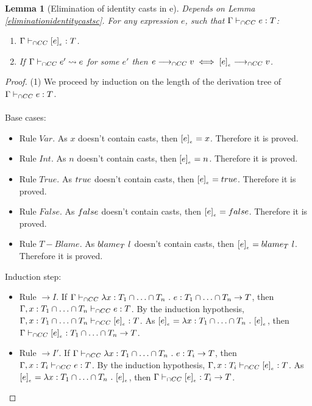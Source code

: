 \documentclass[a4paper]{article}
\newtheorem{lemma}{Lemma}
\begin{document}
\begin{lemma}[Elimination of identity casts in e]
\label{eliminationidentitycastse}
Depends on Lemma \ref{eliminationidentitycastsc}.
For any expression $e$, such that $\Gamma \vdash_{\cap CC} e : T$:
\begin{enumerate}
    \item $\Gamma \vdash_{\cap CC} [e]_{_e} : T$.
    \item If $\Gamma \vdash_{\cap CC} e' \leadsto e$ for some $e'$ then $e \longrightarrow_{\cap CC} v \iff [e]_{_e} \longrightarrow_{\cap CC} v$.
\end{enumerate}
\end{lemma}
\begin{proof}
(1) We proceed by induction on the length of the derivation tree of $\Gamma \vdash_{\cap CC} e : T$.\\\\
Base cases:
\begin{itemize}
    \item Rule $Var$.
    As $x$ doesn't contain casts, then $[e]_{_e} = x$.
    Therefore it is proved.
    \item Rule $Int$.
    As $n$ doesn't contain casts, then $[e]_{_e} = n$.
    Therefore it is proved.
    \item Rule $True$.
    As $true$ doesn't contain casts, then $[e]_{_e} = true$.
    Therefore it is proved.
    \item Rule $False$.
    As $false$ doesn't contain casts, then $[e]_{_e} = false$.
    Therefore it is proved.
    \item Rule $T{-}Blame$.
    As $blame_{T}\ l$ doesn't contain casts, then $[e]_{_e} = blame_{T}\ l$.
    Therefore it is proved.
\end{itemize}
Induction step:
\begin{itemize}
    \item Rule ${\rightarrow} I$.
    If $\Gamma \vdash_{\cap CC} \lambda x : T_1 \cap \ldots \cap T_n\ .\ e : T_1 \cap \ldots \cap T_n \rightarrow T$, then $\Gamma, x : T_1 \cap \ldots \cap T_n \vdash_{\cap CC} e : T$.
    By the induction hypothesis, $\Gamma, x : T_1 \cap \ldots \cap T_n \vdash_{\cap CC} [e]_{_e} : T$.
    As $[e]_{_e} = \lambda x : T_1 \cap \ldots \cap T_n\ .\ [e]_{_e}$, then $\Gamma \vdash_{\cap CC} [e]_{_e} : T_1 \cap \ldots \cap T_n \rightarrow T$.
    \item Rule ${\rightarrow} I'$.
    If $\Gamma \vdash_{\cap CC} \lambda x : T_1 \cap \ldots \cap T_n\ .\ e : T_i \rightarrow T$, then $\Gamma, x : T_i \vdash_{\cap CC} e : T$.
    By the induction hypothesis, $\Gamma, x : T_i \vdash_{\cap CC} [e]_{_e} : T$.
    As $[e]_{_e} = \lambda x : T_1 \cap \ldots \cap T_n\ .\ [e]_{_e}$, then $\Gamma \vdash_{\cap CC} [e]_{_e} : T_i \rightarrow T$.

\end{itemize}
\end{proof}
\end{document}
